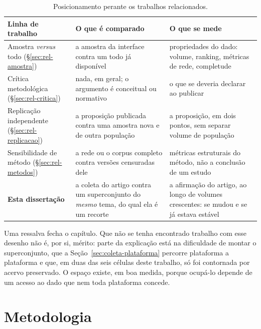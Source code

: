 \begin{table}[htbp]
\centering\footnotesize
\caption[Posicionamento perante os trabalhos relacionados]{Posicionamento perante os trabalhos relacionados.}
\label{tab:relacionados}
\begin{tabularx}{\textwidth}{@{}>{\raggedright\arraybackslash}p{3.9cm}>{\raggedright\arraybackslash}p{4.3cm}X@{}}
\toprule
Linha de trabalho & O que é comparado & O que se mede \\
\midrule
Amostra {\itshape versus} todo
  (\S\ref{sec:rel-amostra})
  & a amostra da interface contra um todo já disponível
  & propriedades do dado: volume, ranking, métricas de rede, completude \\
\addlinespace[2pt]
Crítica metodológica
  (\S\ref{sec:rel-critica})
  & nada, em geral; o argumento é conceitual ou normativo
  & o que se deveria declarar ao publicar \\
\addlinespace[2pt]
Replicação independente
  (\S\ref{sec:rel-replicacao})
  & a proposição publicada contra uma amostra nova e de outra população
  & a proposição, em dois pontos, sem separar volume de população \\
\addlinespace[2pt]
Sensibilidade de método
  (\S\ref{sec:rel-metodos})
  & a rede ou o corpus completo contra versões censuradas dele
  & métricas estruturais do método, não a conclusão de um estudo \\
\addlinespace[2pt]
\textbf{Esta dissertação}
  & a coleta do artigo contra um superconjunto do \emph{mesmo} tema, do qual ela é um recorte
  & a afirmação do artigo, ao longo de volumes crescentes: se mudou e se já estava estável \\
\bottomrule
\end{tabularx}
\end{table}

Uma ressalva fecha o capítulo. Que não se tenha encontrado trabalho com esse desenho
não é, por si, mérito: parte da explicação está na dificuldade de montar o
superconjunto, que a Seção~\ref{sec:coleta-plataforma} percorre plataforma a plataforma
e que, em duas das seis células deste trabalho, só foi contornada por acervo
preservado. O espaço existe, em boa medida, porque ocupá-lo depende de um acesso ao
dado que nem toda plataforma concede.

\chapter{Metodologia}
\label{cap:experimento}

